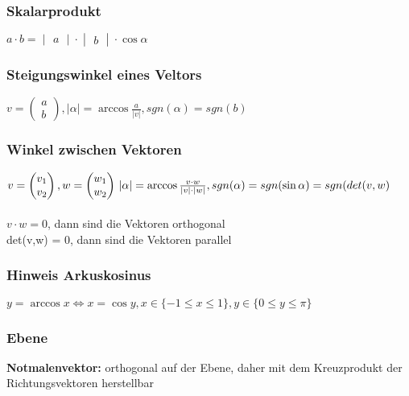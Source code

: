 \documentclass[6pt,a4paper]{scrartcl}
\newcommand{\abs}[1]{\ensuremath{\left\vert#1\right\vert}}
\begin{document}
\begin{multicols*}{3}
\subsubsection{Skalarprodukt}
$a \cdot b = \begin{vmatrix}a\end{vmatrix} \cdot \begin{vmatrix}b\end{vmatrix} \cdot \cos \alpha$\\
\subsubsection{Steigungswinkel eines Veltors}
$v = \begin{pmatrix}a\\b\end{pmatrix}, \abs{\alpha}=\arccos{\frac{a}{\abs{v}}}, sgn(\alpha)=sgn(b)$
\\
\subsubsection{Winkel zwischen Vektoren}
$v = \begin{pmatrix}v_1\\v_2\end{pmatrix}, w = \begin{pmatrix}w_1\\w_2\end{pmatrix}
\\
\abs{\alpha} = \arccos{\frac{v \cdot w}{\abs{v} \cdot \abs{w}}}, sgn(\alpha) = sgn(\sin{\alpha}) = sgn(det(v,w)$\\
\\
$v \cdot w = 0$, dann sind die Vektoren orthogonal\\
det(v,w) = 0, dann sind die Vektoren parallel
\\
\subsubsection{Hinweis Arkuskosinus}
$y = \arccos{x} \Leftrightarrow x = \cos{y}, x \in \{-1 \leq x \leq 1 \}, y \in \{0 \leq y \leq \pi\}$
\subsubsection{Ebene}
\textbf{Notmalenvektor:} orthogonal auf der Ebene, daher mit dem Kreuzprodukt der Richtungsvektoren herstellbar\\


\end{multicols*}
\end{document}
